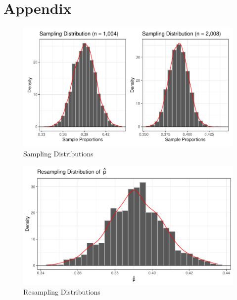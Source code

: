 \documentclass{article}\usepackage[]{graphicx}\usepackage[]{xcolor}
\makeatletter
\def\maxwidth{ %
  \ifdim\Gin@nat@width>\linewidth
    \linewidth
  \else
    \Gin@nat@width
  \fi
}
\newenvironment{knitrout}{}{} %
\makeatother
\begin{document}
\newpage
\onecolumn
\section{Appendix}


\begin{figure}[H]
\begin{center}
\begin{knitrout}
\color{fgcolor}

{\centering \includegraphics[width=\maxwidth]{figure/unnamed-chunk-4-1} 

}


\end{knitrout}
\caption{Sampling Distributions}
\label{plot1} 
\end{center}
\end{figure}


\begin{figure}[H]
\begin{center}
\begin{knitrout}
\color{fgcolor}

{\centering \includegraphics[width=\maxwidth]{figure/unnamed-chunk-5-1} 

}


\end{knitrout}
\caption{Resampling Distributions}
\label{plot2} 
\end{center}
\end{figure}
\end{document}
